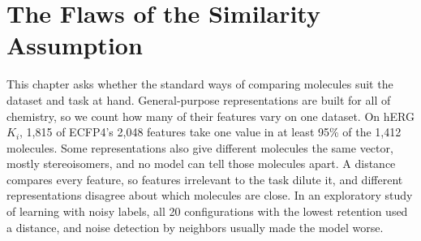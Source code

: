 \chapter{The Flaws of the Similarity Assumption}\label{chap:flaws}

This chapter asks whether the standard ways of comparing molecules suit the dataset and task at hand. General-purpose representations are built for all of chemistry, so we count how many of their features vary on one dataset. On hERG $K_i$, 1,815 of ECFP4's 2,048 features take one value in at least 95\% of the 1,412 molecules. Some representations also give different molecules the same vector, mostly stereoisomers, and no model can tell those molecules apart. A distance compares every feature, so features irrelevant to the task dilute it, and different representations disagree about which molecules are close. In an exploratory study of learning with noisy labels, all 20 configurations with the lowest retention used a distance, and noise detection by neighbors usually made the model worse.




